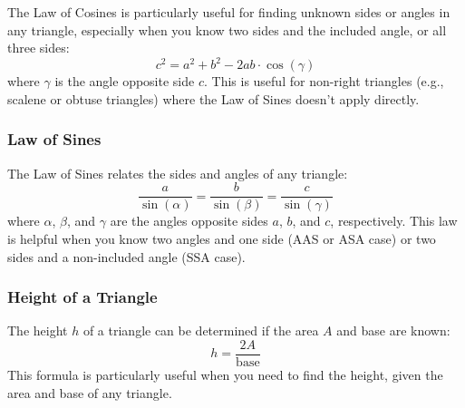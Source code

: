 The Law of Cosines is particularly useful for finding unknown sides or angles in any triangle, especially when you know two sides and the included angle, or all three sides:
\[
c^2 = a^2 + b^2 - 2ab \cdot \cos(\gamma)
\]
where \( \gamma \) is the angle opposite side \( c \). This is useful for non-right triangles (e.g., scalene or obtuse triangles) where the Law of Sines doesn’t apply directly.

\subsubsection{Law of Sines}

The Law of Sines relates the sides and angles of any triangle:
\[
\frac{a}{\sin(\alpha)} = \frac{b}{\sin(\beta)} = \frac{c}{\sin(\gamma)}
\]
where \( \alpha \), \( \beta \), and \( \gamma \) are the angles opposite sides \( a \), \( b \), and \( c \), respectively. This law is helpful when you know two angles and one side (AAS or ASA case) or two sides and a non-included angle (SSA case).

\subsubsection{Height of a Triangle}

The height \( h \) of a triangle can be determined if the area \( A \) and base are known:
\[
h = \frac{2A}{\text{base}}
\]
This formula is particularly useful when you need to find the height, given the area and base of any triangle.
